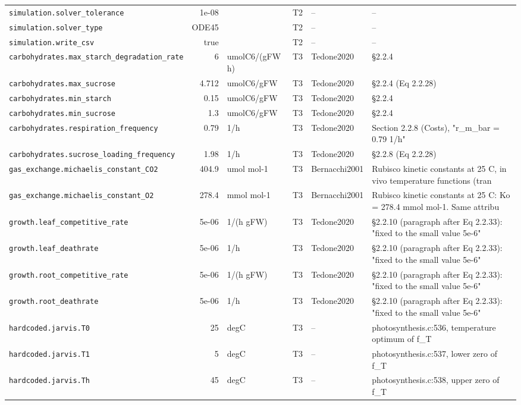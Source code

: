 \documentclass[a4paper,11pt]{article}
\begin{document}
\begin{table}[!htbp]
\begin{tabular}{@{}p{52mm}rp{20mm}cp{20mm}p{38mm}@{}}
\texttt{simulation.solver\_tolerance} & 1e-08 &  & T2 & -- & -- \\
\texttt{simulation.solver\_type} & ODE45 &  & T2 & -- & -- \\
\texttt{simulation.write\_csv} & true &  & T2 & -- & -- \\
\texttt{carbohydrates.max\_starch\_degradation\_rate} & 6 & umolC6/(gFW h) & T3 & Tedone2020 & §2.2.4 \\
\texttt{carbohydrates.max\_sucrose} & 4.712 & umolC6/gFW & T3 & Tedone2020 & §2.2.4 (Eq 2.2.28) \\
\texttt{carbohydrates.min\_starch} & 0.15 & umolC6/gFW & T3 & Tedone2020 & §2.2.4 \\
\texttt{carbohydrates.min\_sucrose} & 1.3 & umolC6/gFW & T3 & Tedone2020 & §2.2.4 \\
\texttt{carbohydrates.respiration\_frequency} & 0.79 & 1/h & T3 & Tedone2020 & Section 2.2.8 (Costs), "r\_m\_bar = 0.79 1/h" \\
\texttt{carbohydrates.sucrose\_loading\_frequency} & 1.98 & 1/h & T3 & Tedone2020 & §2.2.8 (Eq 2.2.28) \\
\texttt{gas\_exchange.michaelis\_constant\_CO2} & 404.9 & umol mol-1 & T3 & Bernacchi2001 & Rubisco kinetic constants at 25 C, in vivo temperature functions (tran \\
\texttt{gas\_exchange.michaelis\_constant\_O2} & 278.4 & mmol mol-1 & T3 & Bernacchi2001 & Rubisco kinetic constants at 25 C: Ko = 278.4 mmol mol-1. Same attribu \\
\texttt{growth.leaf\_competitive\_rate} & 5e-06 & 1/(h gFW) & T3 & Tedone2020 & §2.2.10 (paragraph after Eq 2.2.33): "fixed to the small value 5e-6" \\
\texttt{growth.leaf\_deathrate} & 5e-06 & 1/h & T3 & Tedone2020 & §2.2.10 (paragraph after Eq 2.2.33): "fixed to the small value 5e-6" \\
\texttt{growth.root\_competitive\_rate} & 5e-06 & 1/(h gFW) & T3 & Tedone2020 & §2.2.10 (paragraph after Eq 2.2.33): "fixed to the small value 5e-6" \\
\texttt{growth.root\_deathrate} & 5e-06 & 1/h & T3 & Tedone2020 & §2.2.10 (paragraph after Eq 2.2.33): "fixed to the small value 5e-6" \\
\texttt{hardcoded.jarvis.T0} & 25 & degC & T3 & -- & photosynthesis.c:536, temperature optimum of f\_T \\
\texttt{hardcoded.jarvis.T1} & 5 & degC & T3 & -- & photosynthesis.c:537, lower zero of f\_T \\
\texttt{hardcoded.jarvis.Th} & 45 & degC & T3 & -- & photosynthesis.c:538, upper zero of f\_T \\

\end{tabular}
\end{table}
\end{document}
